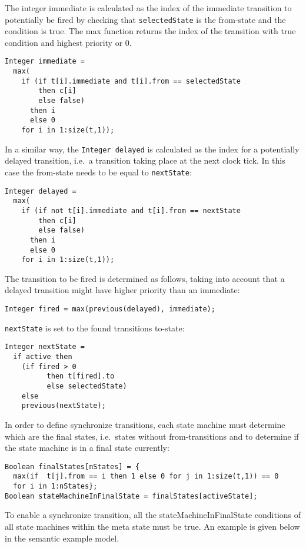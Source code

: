 The integer immediate is calculated as the index of the immediate
transition to potentially be fired by checking that \lstinline!selectedState! is the
from-state and the condition is true. The max function returns the index
of the transition with true condition and highest priority or 0.

\begin{lstlisting}[language=modelica]
Integer immediate =
  max(
    if (if t[i].immediate and t[i].from == selectedState
        then c[i]
        else false)
      then i
      else 0
    for i in 1:size(t,1));
\end{lstlisting}

In a similar way, the \lstinline!Integer delayed! is calculated as the index for a
potentially delayed transition, i.e.\ a transition taking place at the
next clock tick. In this case the from-state needs to be equal to
\lstinline!nextState!:
\begin{lstlisting}[language=modelica]
Integer delayed =
  max(
    if (if not t[i].immediate and t[i].from == nextState
        then c[i]
        else false)
      then i
      else 0
    for i in 1:size(t,1));
\end{lstlisting}

The transition to be fired is determined as follows, taking into account
that a delayed transition might have higher priority than an immediate:
\begin{lstlisting}[language=modelica]
Integer fired = max(previous(delayed), immediate);
\end{lstlisting}
\lstinline!nextState! is set to the found transitions to-state:
\begin{lstlisting}[language=modelica]
Integer nextState =
  if active then
    (if fired > 0
		  then t[fired].to
		  else selectedState)
	else
    previous(nextState);
\end{lstlisting}
In order to define synchronize transitions, each state machine must
determine which are the final states, i.e.\ states without
from-transitions and to determine if the state machine is in a final
state currently:
\begin{lstlisting}[language=modelica]
Boolean finalStates[nStates] = {
  max(if  t[j].from == i then 1 else 0 for j in 1:size(t,1)) == 0
  for i in 1:nStates};
Boolean stateMachineInFinalState = finalStates[activeState];
\end{lstlisting}
To enable a synchronize transition, all the stateMachineInFinalState
conditions of all state machines within the meta state must be true. An
example is given below in the semantic example model.

